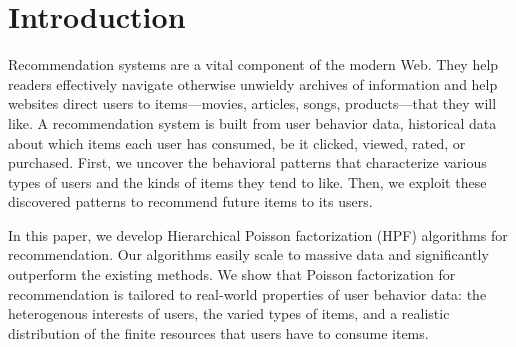 \section{Introduction}

Recommendation systems are a vital component of the modern Web.  They
help readers effectively navigate otherwise unwieldy archives of
information and help websites direct users to items---movies,
articles, songs, products---that they will like.
A recommendation system is built from user behavior data, historical
data about which items each user has consumed, be it clicked, viewed,
rated, or purchased. First, we uncover the behavioral patterns that
characterize various types of users and the kinds of items they tend
to like.  Then, we exploit these discovered patterns to recommend
future items to its users.

In this paper, we develop Hierarchical Poisson factorization (HPF)
algorithms for recommendation.  Our algorithms easily scale to massive
data and significantly outperform the existing methods.  We show that
Poisson factorization for recommendation is tailored to real-world
properties of user behavior data: the heterogenous interests of users,
the varied types of items, and a realistic distribution of the finite
resources that users have to consume items.

